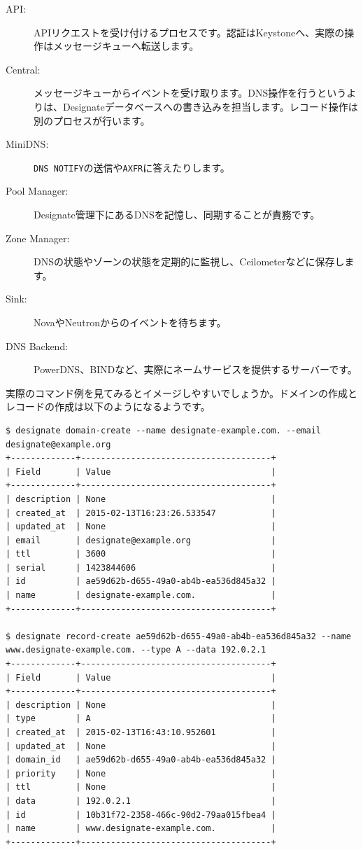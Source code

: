 \begin{description}
	\item[API:] APIリクエストを受け付けるプロセスです。認証はKeystoneへ、実際の操作はメッセージキューへ転送します。
	\item[Central:] メッセージキューからイベントを受け取ります。DNS操作を行うというよりは、Designateデータベースへの書き込みを担当します。レコード操作は別のプロセスが行います。
	\item[MiniDNS:] \verb|DNS NOTIFY|の送信や\verb|AXFR|に答えたりします。
	\item[Pool Manager:] Designate管理下にあるDNSを記憶し、同期することが責務です。
	\item[Zone Manager:] DNSの状態やゾーンの状態を定期的に監視し、Ceilometerなどに保存します。
	\item[Sink:] NovaやNeutronからのイベントを待ちます。
	\item[DNS Backend:] PowerDNS、BINDなど、実際にネームサービスを提供するサーバーです。
\end{description}

実際のコマンド例を見てみるとイメージしやすいでしょうか。ドメインの作成とレコードの作成は以下のようになるようです。

\begin{lstlisting}
$ designate domain-create --name designate-example.com. --email designate@example.org
+-------------+--------------------------------------+
| Field       | Value                                |
+-------------+--------------------------------------+
| description | None                                 |
| created_at  | 2015-02-13T16:23:26.533547           |
| updated_at  | None                                 |
| email       | designate@example.org                |
| ttl         | 3600                                 |
| serial      | 1423844606                           |
| id          | ae59d62b-d655-49a0-ab4b-ea536d845a32 |
| name        | designate-example.com.               |
+-------------+--------------------------------------+

$ designate record-create ae59d62b-d655-49a0-ab4b-ea536d845a32 --name www.designate-example.com. --type A --data 192.0.2.1
+-------------+--------------------------------------+
| Field       | Value                                |
+-------------+--------------------------------------+
| description | None                                 |
| type        | A                                    |
| created_at  | 2015-02-13T16:43:10.952601           |
| updated_at  | None                                 |
| domain_id   | ae59d62b-d655-49a0-ab4b-ea536d845a32 |
| priority    | None                                 |
| ttl         | None                                 |
| data        | 192.0.2.1                            |
| id          | 10b31f72-2358-466c-90d2-79aa015fbea4 |
| name        | www.designate-example.com.           |
+-------------+--------------------------------------+
\end{lstlisting}

